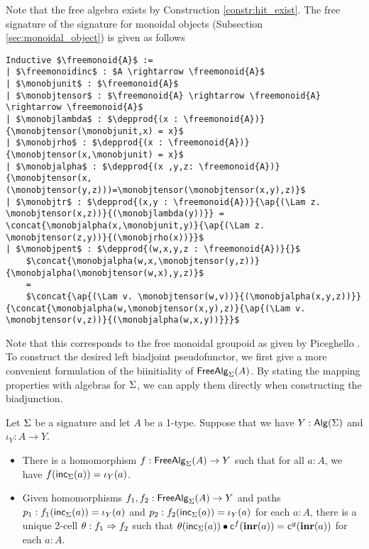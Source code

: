 Note that the free algebra exists by Construction \ref{constr:hit_exist}.
The free signature of the signature for monoidal objects (Subsection \ref{sec:monoidal_object}) is given as follows

\begin{lstlisting}[mathescape=true]
Inductive $\freemonoid{A}$ :=
| $\freemonoidinc$ : $A \rightarrow \freemonoid{A}$
| $\monobjunit$ : $\freemonoid{A}$
| $\monobjtensor$ : $\freemonoid{A} \rightarrow \freemonoid{A} \rightarrow \freemonoid{A}$
| $\monobjlambda$ : $\depprod{(x : \freemonoid{A})}{\monobjtensor(\monobjunit,x) = x}$
| $\monobjrho$ : $\depprod{(x : \freemonoid{A})}{\monobjtensor(x,\monobjunit) = x}$
| $\monobjalpha$ : $\depprod{(x ,y,z: \freemonoid{A})}{\monobjtensor(x,(\monobjtensor(y,z)))=\monobjtensor(\monobjtensor(x,y),z)}$
| $\monobjtr$ : $\depprod{(x,y : \freemonoid{A})}{\ap{(\Lam z. \monobjtensor(x,z))}{(\monobjlambda(y))}} = \concat{\monobjalpha(x,\monobjunit,y)}{\ap{(\Lam z. \monobjtensor(z,y))}{(\monobjrho(x))}}$
| $\monobjpent$ : $\depprod{(w,x,y,z : \freemonoid{A})}{}$
    $\concat{\monobjalpha(w,x,\monobjtensor(y,z))}{\monobjalpha(\monobjtensor(w,x),y,z)}$
    =
    $\concat{\ap{(\Lam v. \monobjtensor(w,v))}{(\monobjalpha(x,y,z))}}{\concat{\monobjalpha(w,\monobjtensor(x,y),z)}{\ap{(\Lam v. \monobjtensor(v,z))}{(\monobjalpha(w,x,y))}}}$
\end{lstlisting}

Note that this corresponds to the free monoidal groupoid as given by Piceghello \cite{piceghello2019}.
To construct the desired left biadjoint pseudofunctor, we first give a more convenient formulation of the biinitiality of $\mathsf{FreeAlg}_{\Sigma}(A)$.
By stating the mapping properties with algebras for $\Sigma$, we can apply them directly when constructing the biadjunction.

\begin{corollary}
\label{cor:free_alg_ump}
Let $\Sigma$ be a signature and let $A$ be a 1-type.
Suppose that we have $Y : \mathsf{Alg}(\Sigma)$ and $\iota_Y : A \rightarrow Y$.
\begin{itemize}
	\item There is a homomorphism $f : \mathsf{FreeAlg}_{\Sigma}(A) \rightarrow Y$ such that for all $a : A$, we have $f(\mathsf{inc}_{\Sigma}(a)) = \iota_Y(a)$.
	\item
	Given homomorphisms $f_1, f_2 : \mathsf{FreeAlg}_{\Sigma}(A) \rightarrow Y$
	and paths $p_1 : f_1(\mathsf{inc}_{\Sigma}(a)) = \iota_Y(a)$ and $p_2 : f_2(\mathsf{inc}_{\Sigma}(a)) = \iota_Y(a)$ for each $a : A$,
	there is a unique 2-cell $\theta : f_1 \Rightarrow f_2$
	such that $\theta(\mathsf{inc}_{\Sigma}(a)) \bullet \mathsf{c}^{f}(\operatorname{\mathbf{inr}}(a)) = \mathsf{c}^{g}(\operatorname{\mathbf{inr}}(a))$ for each $a : A$.
\end{itemize} 
\end{corollary}

